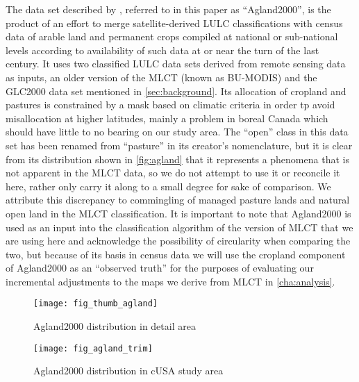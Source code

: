 The data set described by \citet{Ramankutty2008}, referred to in this
paper as ``Agland2000'', is the product of an effort to merge
satellite-derived LULC classifications with census data of arable land
and permanent crops compiled at national or sub-national levels
according to availability of such data at or near the turn of the last
century.  It uses two classified LULC data sets derived from remote
sensing data as inputs, an older version of the MLCT (known as
BU-MODIS) and the GLC2000 data set mentioned in
\autoref{sec:background}.  Its allocation of cropland and pastures is
constrained by a mask based on climatic criteria in order tp avoid
misallocation at higher latitudes, mainly a problem in boreal Canada
which should have little to no bearing on our study area.  The
``open'' class in this data set has been renamed from ``pasture'' in
its creator's nomenclature, but it is clear from its distribution
shown in \autoref{fig:agland} that it represents a phenomena that is
not apparent in the MLCT data, so we do not attempt to use it or
reconcile it here, rather only carry it along to a small degree for
sake of comparison.  We attribute this discrepancy to commingling of
managed pasture lands and natural open land in the MLCT
classification.  It is important to note that Agland2000 is used as an
input into the classification algorithm of the version of MLCT that we
are using here and acknowledge the possibility of circularity when
comparing the two, but because of its basis in census data we will use
the cropland component of Agland2000 as an ``observed truth'' for the
purposes of evaluating our incremental adjustments to the maps we
derive from MLCT in \autoref{cha:analysis}.
  

\begin{figure}[hpt]
\begin{center}
  

\texttt{[image: fig\_thumb\_agland]}
\end{center} 
\caption{Agland2000 distribution in detail area}
\label{fig:thumb_agland} 
\end{figure} 

\begin{figure}[hpt]
\begin{center}
  


\texttt{[image: fig\_agland\_trim]}
\end{center} 
\caption{Agland2000 distribution in cUSA study area}
\label{fig:agland} 
\end{figure} 


